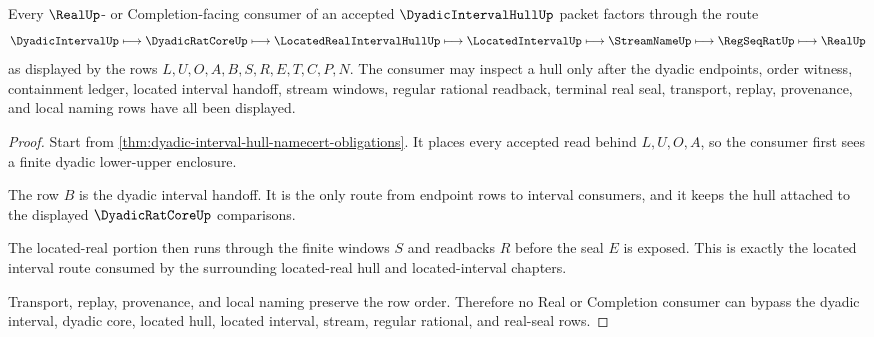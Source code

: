 \begin{theorem}
\label{thm:dyadic-interval-hull-located-real-route}
Every $\RealUp$- or Completion-facing consumer of an accepted $\DyadicIntervalHullUp$ packet factors through the route
$$
\DyadicIntervalUp \longmapsto \DyadicRatCoreUp \longmapsto \LocatedRealIntervalHullUp \longmapsto \LocatedIntervalUp \longmapsto \StreamNameUp \longmapsto \RegSeqRatUp \longmapsto \RealUp
$$
as displayed by the rows $L,U,O,A,B,S,R,E,T,C,P,N$. The consumer may inspect a hull only after the dyadic endpoints, order witness, containment ledger, located interval handoff, stream windows, regular rational readback, terminal real seal, transport, replay, provenance, and local naming rows have all been displayed.
\end{theorem}
\begin{proof}
Start from \autoref{thm:dyadic-interval-hull-namecert-obligations}. It places every accepted read behind $L,U,O,A$, so the consumer first sees a finite dyadic lower-upper enclosure.

The row $B$ is the dyadic interval handoff. It is the only route from endpoint rows to interval consumers, and it keeps the hull attached to the displayed $\DyadicRatCoreUp$ comparisons.

The located-real portion then runs through the finite windows $S$ and readbacks $R$ before the seal $E$ is exposed. This is exactly the located interval route consumed by the surrounding located-real hull and located-interval chapters.

Transport, replay, provenance, and local naming preserve the row order. Therefore no Real or Completion consumer can bypass the dyadic interval, dyadic core, located hull, located interval, stream, regular rational, and real-seal rows.
\end{proof}


\begin{closurestatus}{\DyadicIntervalHullUp}
  \theoryclosure{\seedClosure}
  \formalstatus{\unformalizedV}
\end{closurestatus}
